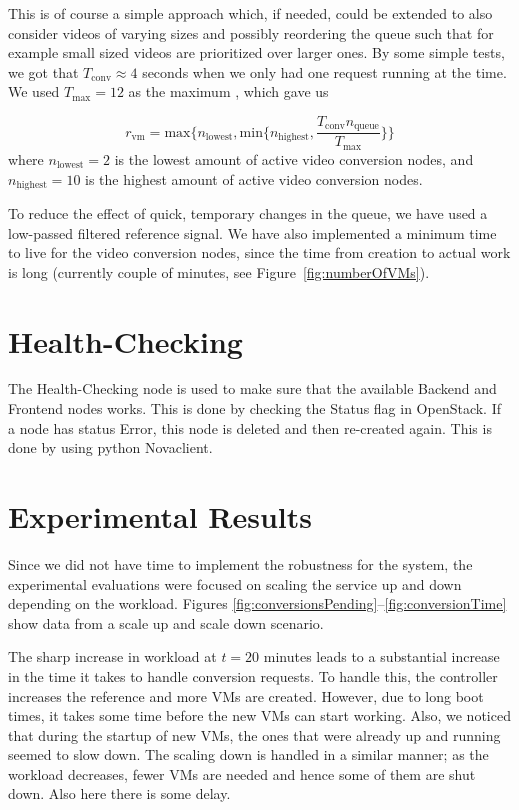 \documentclass[a4paper, 10pt, english]{article}
\begin{document}
This is of course a simple approach which, if needed, could be extended to also consider videos of varying sizes and possibly reordering the queue such that for example small sized videos are prioritized over larger ones. By some simple tests, we got that $T_{\text{conv}} \approx 4$ seconds when we only had one request running at the time. We used $T_{\text{max}} = 12$ as the maximum , which gave us

\begin{equation*}
	r_{\text{vm}} = \text{max}\{n_{\text{lowest}}, \text{min}\{n_{\text{highest}}, \frac{T_{\text{conv}}  n_{\text{queue}}}{T_{\text{max}}}\} \}
\end{equation*} 
where $n_{\text{lowest}} = 2$ is the lowest amount of  active video conversion nodes, and $n_{\text{highest}} = 10$ is the highest amount of active video conversion nodes. 

To reduce the effect of quick, temporary  changes in the queue, we have used a low-passed filtered reference signal. We have also implemented a minimum time to live for the video conversion nodes, since the time from creation to actual work is long (currently couple of minutes, see Figure~\ref{fig:numberOfVMs}).

\section{Health-Checking} \label{sec:HC}
The Health-Checking node is used to make sure that the available Backend and Frontend nodes works. This is done by checking the Status flag in OpenStack. If a node has status Error, this node is deleted and then re-created again. This is done by using python Novaclient.


\section{Experimental Results}
Since we did not have time to implement the robustness for the system, the experimental evaluations were focused on scaling the service up and down depending on the workload. Figures \ref{fig:conversionsPending}--\ref{fig:conversionTime} show data from a scale up and scale down scenario. 

The sharp increase in workload at $ t=20 $ minutes leads to a substantial increase in the time it takes to handle conversion requests. To handle this, the controller increases the reference and more VMs are created. However, due to long boot times, it takes some time before the new VMs can start working. Also, we noticed that during the startup of new VMs, the ones that were already up and running seemed to slow down. The scaling down is handled in a similar manner; as the workload decreases, fewer VMs are needed and hence some of them are shut down. Also here there is some delay.
\end{document}
